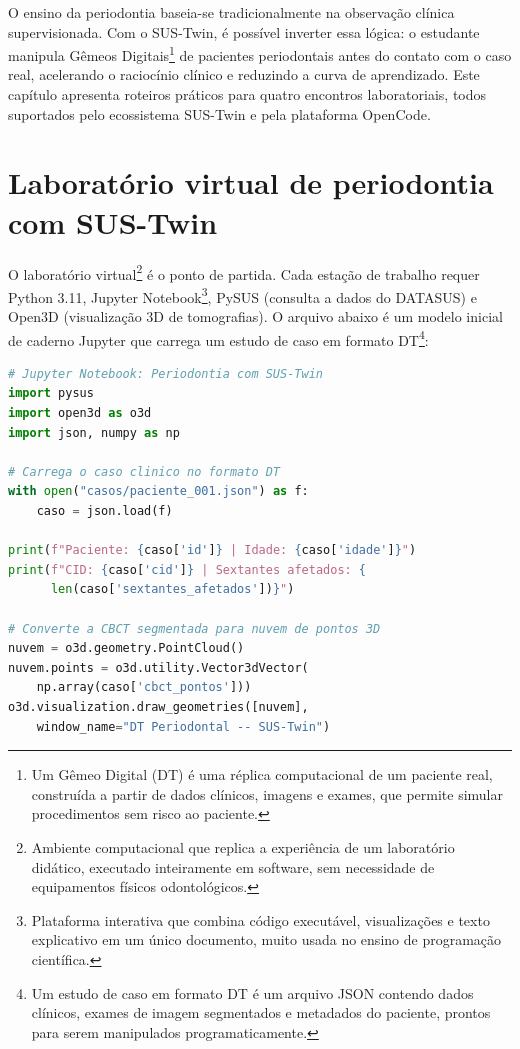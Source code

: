 \label{ch:educacao}

O ensino da periodontia baseia-se tradicionalmente na observação clínica
supervisionada. Com o SUS-Twin, é possível inverter essa lógica: o estudante
manipula Gêmeos Digitais\footnote{Um Gêmeo Digital (DT) é uma réplica
computacional de um paciente real, construída a partir de dados clínicos,
imagens e exames, que permite simular procedimentos sem risco ao paciente.}
de pacientes periodontais antes do contato com o caso real, acelerando o
raciocínio clínico e reduzindo a curva de aprendizado. Este capítulo
apresenta roteiros práticos para quatro encontros laboratoriais, todos
suportados pelo ecossistema SUS-Twin e pela plataforma OpenCode.

\section{Laboratório virtual de periodontia com SUS-Twin}
\label{sec:lab-virtual}

O laboratório virtual\footnote{Ambiente computacional que replica a
experiência de um laboratório didático, executado inteiramente em software,
sem necessidade de equipamentos físicos odontológicos.} é o ponto de partida.
Cada estação de trabalho requer Python 3.11, Jupyter Notebook\footnote{
Plataforma interativa que combina código executável, visualizações e texto
explicativo em um único documento, muito usada no ensino de programação
científica.}, PySUS (consulta a dados do DATASUS) e Open3D (visualização 3D
de tomografias). O arquivo abaixo é um modelo inicial de caderno Jupyter que
carrega um estudo de caso em formato DT\footnote{Um estudo de caso em formato
DT é um arquivo JSON contendo dados clínicos, exames de imagem segmentados e
metadados do paciente, prontos para serem manipulados programaticamente.}:

\begin{lstlisting}[language=Python,
caption={modelo\_dt\_starter.ipynb -- carrega e inspeciona um DT
periodontal}]
# Jupyter Notebook: Periodontia com SUS-Twin
import pysus
import open3d as o3d
import json, numpy as np

# Carrega o caso clinico no formato DT
with open("casos/paciente_001.json") as f:
    caso = json.load(f)

print(f"Paciente: {caso['id']} | Idade: {caso['idade']}")
print(f"CID: {caso['cid']} | Sextantes afetados: {
      len(caso['sextantes_afetados'])}")

# Converte a CBCT segmentada para nuvem de pontos 3D
nuvem = o3d.geometry.PointCloud()
nuvem.points = o3d.utility.Vector3dVector(
    np.array(caso['cbct_pontos']))
o3d.visualization.draw_geometries([nuvem],
    window_name="DT Periodontal -- SUS-Twin")
\end{lstlisting}

